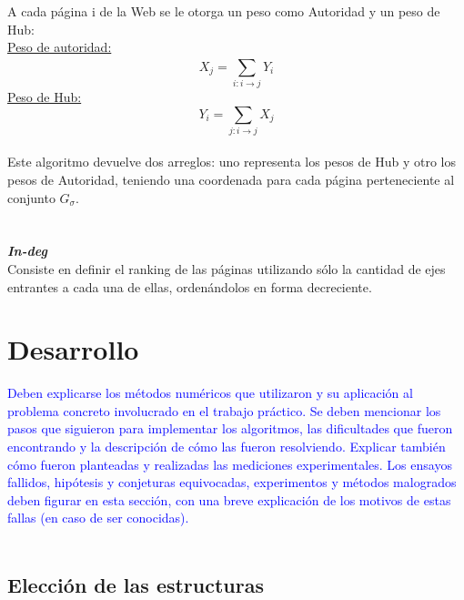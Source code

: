 \documentclass[a4paper]{article}
\begin{document}
\indent A cada p\'agina i de la Web se le otorga un peso como Autoridad y un peso de Hub: \\
\indent \underline{Peso de autoridad:}
\[
	X_j = \sum_{i: i\rightarrow j}^{} Y_i
\]
\indent \underline{Peso de Hub:}
\[
Y_i = \sum_{j: i\rightarrow j} X_j
\]
\\
Este algoritmo devuelve dos arreglos: uno representa los pesos de Hub y otro los pesos de Autoridad, teniendo una coordenada para cada p\'agina perteneciente al conjunto $G_\sigma$.\\
\\
\\
\indent \indent \emph{\textbf{In-deg}} \\
\indent Consiste en definir el ranking de las p\'aginas utilizando s\'olo la cantidad de ejes entrantes a cada una de ellas, orden\'andolos en forma decreciente.\\

\newpage
\section{Desarrollo}
\textcolor{blue}{
Deben explicarse los m\'etodos num\'ericos que utilizaron y su aplicaci\'on al problema
concreto involucrado en el trabajo pr\'actico. Se deben mencionar los pasos que siguieron
para implementar los algoritmos, las dificultades que fueron encontrando y la
descripci\'on de c\'omo las fueron resolviendo. Explicar tambi\'en c\'omo fueron planteadas
y realizadas las mediciones experimentales. Los ensayos fallidos, hip\'otesis y conjeturas
equivocadas, experimentos y m\'etodos malogrados deben figurar en esta secci\'on, con
una breve explicaci\'on de los motivos de estas fallas (en caso de ser conocidas).\\
}
\\
\subsection{Elecci\'on de las estructuras}
\end{document}
